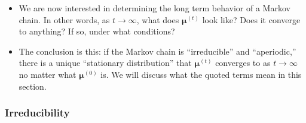 \documentclass[10pt]{article}
\newcommand{\ves}[1]{\boldsymbol{#1}}
\begin{document}
\begin{itemize}
  \item We are now interested in determining the long term behavior of a Markov chain. In other words, as $t \rightarrow \infty$, what does $\ves{\mu}^{(t)}$ look like? Does it converge to anything? If so, under what conditions?
  
  \item The conclusion is this: if the Markov chain is ``irreducible'' and ``aperiodic,'' there is a unique ``stationary distribution'' that $\ves{\mu}^{(t)}$ converges to as $t \rightarrow \infty$ no matter what $\ves{\mu}^{(0)}$ is. We will discuss what the quoted terms mean in this section.
\end{itemize}

\subsubsection{Irreducibility}
\end{document}
